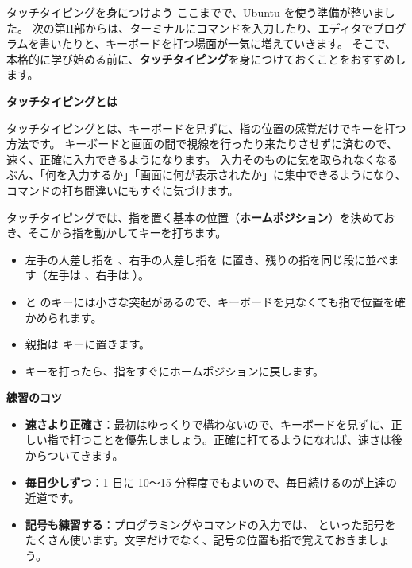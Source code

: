 \begin{tips}{タッチタイピングを身につけよう}
  ここまでで、Ubuntu を使う準備が整いました。
  次の第II部からは、ターミナルにコマンドを入力したり、エディタでプログラムを書いたりと、キーボードを打つ場面が一気に増えていきます。
  そこで、本格的に学び始める前に、\textbf{タッチタイピング}を身につけておくことをおすすめします。

  \textbf{タッチタイピングとは}

  タッチタイピングとは、キーボードを見ずに、指の位置の感覚だけでキーを打つ方法です。
  キーボードと画面の間で視線を行ったり来たりさせずに済むので、速く、正確に入力できるようになります。
  入力そのものに気を取られなくなるぶん、「何を入力するか」「画面に何が表示されたか」に集中できるようになり、コマンドの打ち間違いにもすぐに気づけます。

  タッチタイピングでは、指を置く基本の位置（\textbf{ホームポジション}）を決めておき、そこから指を動かしてキーを打ちます。

  \begin{itemize}
    \item 左手の人差し指を 、右手の人差し指を  に置き、残りの指を同じ段に並べます（左手は    、右手は    \key{;}）。
    \item {} と  のキーには小さな突起があるので、キーボードを見なくても指で位置を確かめられます。
    \item 親指は  キーに置きます。
    \item キーを打ったら、指をすぐにホームポジションに戻します。
  \end{itemize}

  \textbf{練習のコツ}

  \begin{itemize}
    \item \textbf{速さより正確さ}：最初はゆっくりで構わないので、キーボードを見ずに、正しい指で打つことを優先しましょう。正確に打てるようになれば、速さは後からついてきます。
    \item \textbf{毎日少しずつ}：1 日に 10〜15 分程度でもよいので、毎日続けるのが上達の近道です。
    \item \textbf{記号も練習する}：プログラミングやコマンドの入力では、\cmd{/} \cmd{-} \cmd{\_} \cmd{|} \cmd{\textasciitilde}   \cmd{( )} \cmd{[ ]} \cmd{\{ \}} といった記号をたくさん使います。文字だけでなく、記号の位置も指で覚えておきましょう。
  \end{itemize}


\end{tips}
